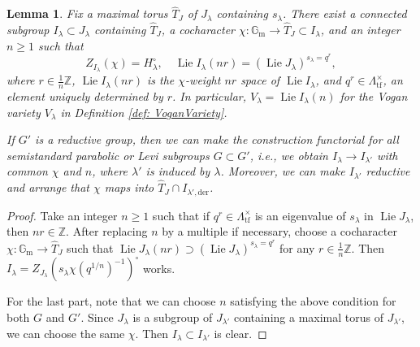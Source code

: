 \documentclass{amsart}
\newtheorem{lemma}[theorem]{Lemma}
\theoremstyle{definition}
\theoremstyle{remark}
\numberwithin{equation}{section}
\DeclareMathOperator{\Lie}{Lie}
\newcommand{\der}{\mathrm{der}}
\newcommand{\Z}{\mathbb{Z}}
\newcommand{\Gm}{{\mathbb{G}_{\mathrm{m}}}}
\newcommand{\wh}{\widehat}
\newcommand{\tf}{\mathrm{tf}}
\begin{document}
\begin{lemma}\label{lem: ReductionToGradedUnipotent}
Fix a maximal torus $\wh T_J$ of $J_\lambda$ containing $s_\lambda$. There exist a connected subgroup $I_\lambda \subset J_\lambda$ containing $\wh T_J$, a cocharacter $\chi\colon \Gm\to \wh T_J \subset I_\lambda$, and an integer $n\geq 1$ such that
\[
Z_{I_\lambda}(\chi)=H_\lambda^\circ, \quad \Lie I_\lambda (nr) = (\Lie J_\lambda)^{s_\lambda=q^r}, 
\]
where $r\in \frac{1}{n}\Z$, $\Lie I_\lambda (nr)$ is the $\chi$-weight $nr$ space of $\Lie I_\lambda$, and $q^r\in \Lambda_\tf^\times$, an element uniquely determined by $r$. In particular, $V_\lambda=\Lie I_\lambda (n)$ for the Vogan variety $V_\lambda$ in Definition \ref{def: VoganVariety}. 

If $G'$ is a reductive group, then we can make the construction functorial for all semistandard parabolic or Levi subgroups $G\subset G'$, i.e., we obtain $I_\lambda\to I_{\lambda'}$ with common $\chi$ and $n$, where $\lambda'$ is induced by $\lambda$. Moreover, we can make $I_{\lambda'}$ reductive and arrange that $\chi$ maps into $\wh T_J\cap I_{\lambda', \der}$. 
\end{lemma}

\begin{proof}
Take an integer $n\geq 1$ such that if $q^r\in \Lambda_\tf^\times$ is an eigenvalue of $s_\lambda$ in $\Lie J_\lambda$, then $nr\in \Z$. After replacing $n$ by a multiple if necessary, choose a cocharacter $\chi\colon \Gm\to \wh T_J $ such that $\Lie J_\lambda (nr) \supset (\Lie J_\lambda)^{s_\lambda=q^r}$ for any $r\in \frac{1}{n}\Z$. Then $I_\lambda=Z_{J_\lambda}(s_\lambda\chi (q^{1/n})^{-1})^{\circ}$ works. 

For the last part, note that we can choose $n$ satisfying the above condition for both $G$ and $G'$. Since $J_\lambda$ is a subgroup of $J_{\lambda'}$ containing a maximal torus of $J_{\lambda'}$, we can choose the same $\chi$. Then $I_\lambda\subset I_{\lambda'}$ is clear. 
\end{proof}
\end{document}
